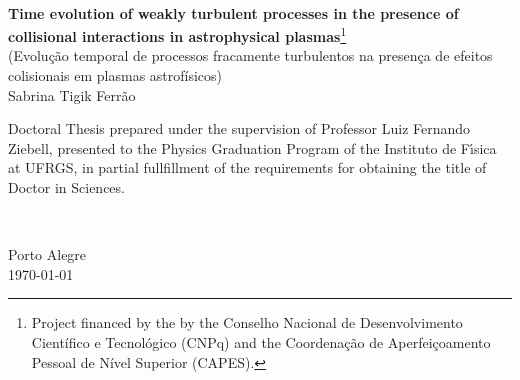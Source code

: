 \begin{titlepage}
  \begin{center}
  \\
\end{center}

\vspace{6cm}

\vfill
\begin{center}
\renewcommand{\thefootnote}{\fnsymbol{footnote}}
\setcounter{footnote}{2}
{\Large \sffamily \textbf{Time evolution of weakly turbulent processes in
    the presence of collisional interactions in astrophysical plasmas}\footnote[1]{
    Project financed by the by the Conselho Nacional de
    Desenvolvimento Científico e Tecnológico (CNPq) and the
    Coordenação de Aperfeiçoamento Pessoal de Nível Superior (CAPES).}}\\
{\large \sffamily (Evolução temporal de processos fracamente turbulentos
  na presença de efeitos colisionais em plasmas astrofísicos)}\\
\vspace{1.5cm}
\Large Sabrina Tigik Ferrão\\
\end{center}
\vspace{3cm}
\vfill
\hfill
\parbox{.5\textwidth}{Doctoral Thesis prepared under the supervision of
  Professor Luiz Fernando Ziebell, presented to the Physics Graduation
  Program of the Instituto de F\'{\i}sica at UFRGS, in partial fullfillment
  of the requirements for obtaining the title of Doctor in Sciences.}\\
\vfill
\vspace{1cm}
\begin{center}
  { Porto Alegre\\ \today}
\vspace{0.5cm}
\renewcommand{\thefootnote}{\arabic{footnote}}
\end{center}

\end{titlepage}

